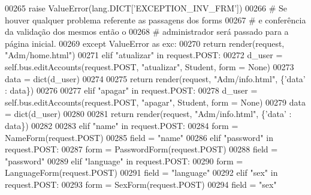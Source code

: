\begin{DoxyCode}
00265                         \textcolor{keywordflow}{raise} ValueError(lang.DICT[\textcolor{stringliteral}{'EXCEPTION\_INV\_FRM'}])
00266                 \textcolor{comment}{# Se houver qualquer problema referente as passagens dos forms 
}
00267                 \textcolor{comment}{#   e conferência da validação dos mesmos então o 
}
00268                 \textcolor{comment}{#   administrador será passado para a página inicial.
}
00269                 \textcolor{keywordflow}{except} ValueError \textcolor{keyword}{as} exc:
00270                     \textcolor{keywordflow}{return} render(request, \textcolor{stringliteral}{"Adm/home.html"})
00271             \textcolor{keywordflow}{elif} \textcolor{stringliteral}{"atualizar"} \textcolor{keywordflow}{in} request.POST:
00272                 d\_user = self.bus.editAccounts(request.POST, \textcolor{stringliteral}{"atualizar"}, Student, form = \textcolor{keywordtype}{None})
00273                 data = dict(d\_user)
00274 
00275                 \textcolor{keywordflow}{return} render(request, \textcolor{stringliteral}{"Adm/info.html"}, \{\textcolor{stringliteral}{'data'} : data\})
00276             
00277             \textcolor{keywordflow}{elif} \textcolor{stringliteral}{"apagar"} \textcolor{keywordflow}{in} request.POST:
00278                 d\_user = self.bus.editAccounts(request.POST, \textcolor{stringliteral}{"apagar"}, Student, form = \textcolor{keywordtype}{None})
00279                 data = dict(d\_user)
00280 
00281                 \textcolor{keywordflow}{return} render(request, \textcolor{stringliteral}{"Adm/info.html"}, \{\textcolor{stringliteral}{'data'} : data\})
00282 
00283             \textcolor{keywordflow}{elif} \textcolor{stringliteral}{"name"} \textcolor{keywordflow}{in} request.POST:
00284                 form = NameForm(request.POST)
00285                 field = \textcolor{stringliteral}{"name"}
00286             \textcolor{keywordflow}{elif}  \textcolor{stringliteral}{"password"} \textcolor{keywordflow}{in} request.POST:
00287                 form = PasswordForm(request.POST)
00288                 field = \textcolor{stringliteral}{"password"}
00289             \textcolor{keywordflow}{elif} \textcolor{stringliteral}{"language"} \textcolor{keywordflow}{in} request.POST:
00290                 form = LanguageForm(request.POST)
00291                 field = \textcolor{stringliteral}{"language"}
00292             \textcolor{keywordflow}{elif} \textcolor{stringliteral}{"sex"} \textcolor{keywordflow}{in} request.POST:
00293                 form = SexForm(request.POST)
00294                 field = \textcolor{stringliteral}{"sex"}

\end{DoxyCode}

